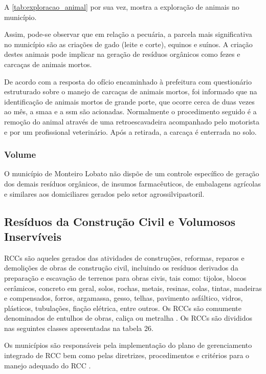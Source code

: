 	A \autoref{tab:exploracao_animal} por sua vez, mostra a exploração de animais no município.
	
	
	
	Assim, pode-se observar que em relação a pecuária, a parcela mais significativa no município são as criações de gado (leite e corte), equinos e suínos. A criação destes animais pode implicar na geração de resíduos orgânicos como fezes e carcaças de animais mortos.
	
	De acordo com a resposta do ofício encaminhado à prefeitura com questionário estruturado sobre o manejo de carcaças de animais mortos, foi informado que na identificação de animais mortos de grande porte, que ocorre cerca de duas vezes ao mês, a \gls{smaa} e a \gls{ssm} são acionadas. Normalmente o procedimento seguido é a remoção do animal através de uma retroescavadeira acompanhado pelo motorista e por um profissional veterinário. Após a retirada, a carcaça é enterrada no solo.
	
	\subsubsection{Volume}
	O município de Monteiro Lobato não dispõe de um controle específico de geração dos demais resíduos orgânicos, de insumos farmacêuticos, de embalagens agrícolas e similares aos domiciliares gerados pelo setor agrossilvipastoril.
	
	\subsection{Resíduos da Construção Civil e Volumosos Inservíveis}
	RCCs são aqueles gerados das atividades de construções, reformas, reparos e demolições de obras de construção civil, incluindo os resíduos derivados da preparação e escavação de terrenos para obras civis, tais como: tijolos, blocos cerâmicos, concreto em geral, solos, rochas, metais, resinas, colas, tintas, madeiras e compensados, forros, argamassa, gesso, telhas, pavimento asfáltico, vidros, plásticos, tubulações, fiação elétrica, entre outros. Os RCCs são comumente denominados de entulhos de obras, caliça ou metralha \cite{brasil:12305, conama:307}. Os RCCs são divididos nas seguintes classes apresentadas na tabela 26.
	
	
	
	Os municípios são responsáveis pela implementação do plano de gerenciamento integrado de RCC bem como pelas diretrizes, procedimentos e critérios para o manejo adequado do RCC \cite{conama:307}. 
	
